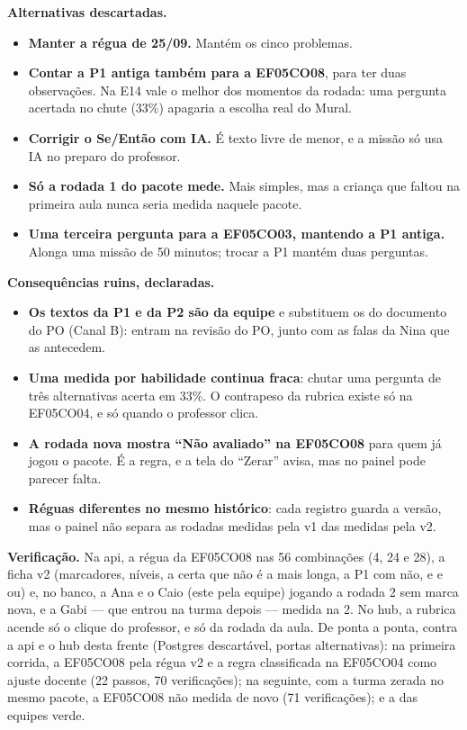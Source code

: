 \textbf{Alternativas descartadas.}

\begin{itemize}
  \item \textbf{Manter a régua de 25/09.} Mantém os cinco problemas.
  \item \textbf{Contar a P1 antiga também para a EF05CO08}, para ter duas
    observações. Na E14 vale o melhor dos momentos da rodada: uma pergunta
    acertada no chute (33\%) apagaria a escolha real do Mural.
  \item \textbf{Corrigir o Se/Então com IA.} É texto livre de menor, e a
    missão só usa IA no preparo do professor.
  \item \textbf{Só a rodada 1 do pacote mede.} Mais simples, mas a criança que
    faltou na primeira aula nunca seria medida naquele pacote.
  \item \textbf{Uma terceira pergunta para a EF05CO03, mantendo a P1 antiga.}
    Alonga uma missão de 50 minutos; trocar a P1 mantém duas perguntas.
\end{itemize}

\textbf{Consequências ruins, declaradas.}

\begin{itemize}
  \item \textbf{Os textos da P1 e da P2 são da equipe} e substituem os do
    documento do PO (Canal B): entram na revisão do PO, junto com as falas da
    Nina que as antecedem.
  \item \textbf{Uma medida por habilidade continua fraca}: chutar uma pergunta
    de três alternativas acerta em 33\%. O contrapeso da rubrica existe só na
    EF05CO04, e só quando o professor clica.
  \item \textbf{A rodada nova mostra \enquote{Não avaliado} na EF05CO08} para
    quem já jogou o pacote. É a regra, e a tela do \enquote{Zerar} avisa, mas
    no painel pode parecer falta.
  \item \textbf{Réguas diferentes no mesmo histórico}: cada registro guarda a
    versão, mas o painel não separa as rodadas medidas pela v1 das medidas pela
    v2.
\end{itemize}

\textbf{Verificação.} Na api, a régua da EF05CO08 nas 56 combinações (4, 24 e
28), a ficha v2 (marcadores, níveis, a certa que não é a mais longa, a P1 com
não, e e ou) e, no banco, a Ana e o Caio (este pela equipe) jogando a rodada 2
sem marca nova, e a Gabi --- que entrou na turma depois --- medida na 2. No hub,
a rubrica acende só o clique do professor, e só da rodada da aula. De ponta a
ponta, contra a api e o hub desta frente (Postgres descartável, portas
alternativas): na primeira corrida, a EF05CO08 pela régua v2 e a regra
classificada na EF05CO04 como ajuste docente (22 passos, 70 verificações); na
seguinte, com a turma zerada no mesmo pacote, a EF05CO08 não medida de novo
(71 verificações); e a das equipes verde.

